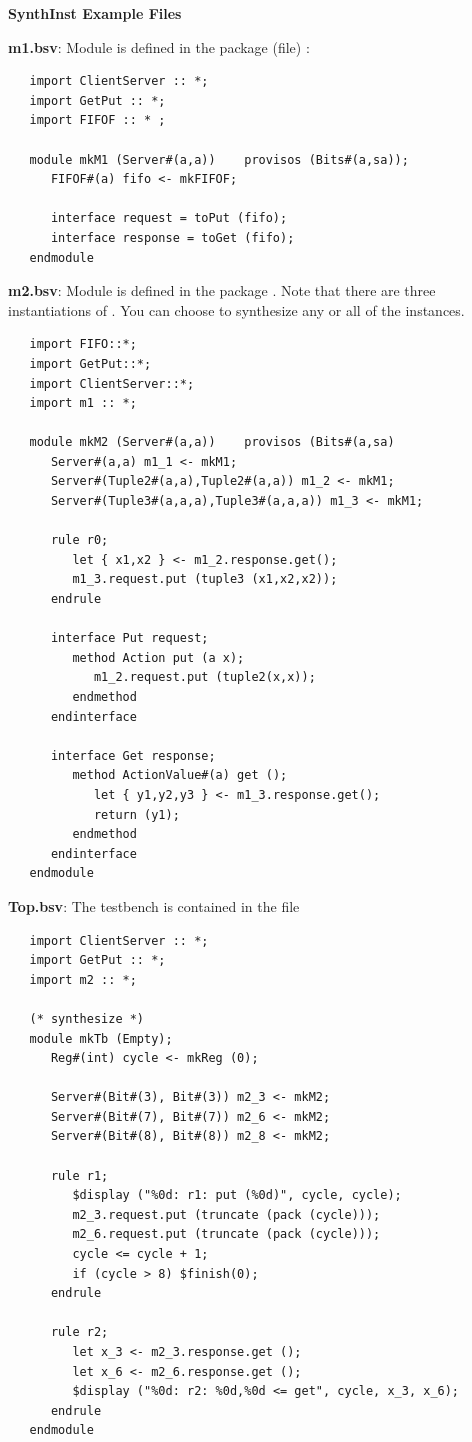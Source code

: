 {\bf SynthInst Example Files}
\label{poly-example}

{\bf m1.bsv}: Module  is defined in the package (file) :

\begin{verbatim}
   import ClientServer :: *;
   import GetPut :: *;
   import FIFOF :: * ;

   module mkM1 (Server#(a,a))    provisos (Bits#(a,sa));
      FIFOF#(a) fifo <- mkFIFOF;

      interface request = toPut (fifo);
      interface response = toGet (fifo);
   endmodule
\end{verbatim}

{\bf m2.bsv}: Module  is defined in the package .  Note that
there are three instantiations of .  You can choose to
synthesize any or all of the instances.

\begin{verbatim}
   import FIFO::*;
   import GetPut::*;
   import ClientServer::*;
   import m1 :: *;

   module mkM2 (Server#(a,a))    provisos (Bits#(a,sa)
      Server#(a,a) m1_1 <- mkM1;
      Server#(Tuple2#(a,a),Tuple2#(a,a)) m1_2 <- mkM1;
      Server#(Tuple3#(a,a,a),Tuple3#(a,a,a)) m1_3 <- mkM1;

      rule r0;
         let { x1,x2 } <- m1_2.response.get();
         m1_3.request.put (tuple3 (x1,x2,x2));
      endrule

      interface Put request;
         method Action put (a x);
            m1_2.request.put (tuple2(x,x));
         endmethod
      endinterface

      interface Get response;
         method ActionValue#(a) get ();
            let { y1,y2,y3 } <- m1_3.response.get();
            return (y1);
         endmethod
      endinterface
   endmodule
\end{verbatim}

{\bf Top.bsv}: The testbench is contained in the file 
\begin{verbatim}
   import ClientServer :: *;
   import GetPut :: *;
   import m2 :: *; 
   
   (* synthesize *)
   module mkTb (Empty);
      Reg#(int) cycle <- mkReg (0);
   
      Server#(Bit#(3), Bit#(3)) m2_3 <- mkM2;
      Server#(Bit#(7), Bit#(7)) m2_6 <- mkM2;
      Server#(Bit#(8), Bit#(8)) m2_8 <- mkM2;
   
      rule r1;
         $display ("%0d: r1: put (%0d)", cycle, cycle);
         m2_3.request.put (truncate (pack (cycle)));
         m2_6.request.put (truncate (pack (cycle)));
         cycle <= cycle + 1;
         if (cycle > 8) $finish(0);
      endrule
   
      rule r2;
         let x_3 <- m2_3.response.get ();
         let x_6 <- m2_6.response.get ();
         $display ("%0d: r2: %0d,%0d <= get", cycle, x_3, x_6);
      endrule
   endmodule
\end{verbatim}

